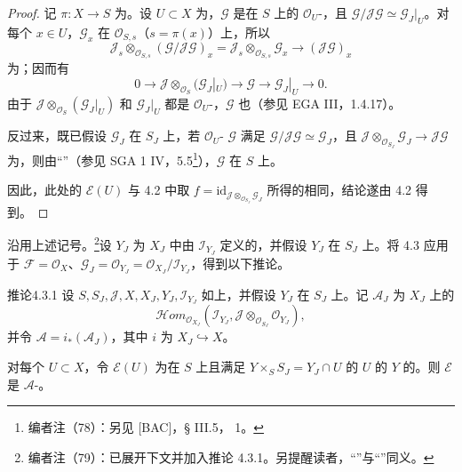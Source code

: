 \begin{proof}
记 $\pi:X\to S$ 为。设 $U\subset X$ 为，$\mathscr G$ 是在 $S$ 上的 $\mathscr O_U$-，且 $\mathscr G/\mathscr J\mathscr G\simeq\mathscr G_J|_U$。对每个 $x\in U$，$\mathscr G_x$ 在 $\mathscr O_{S,s}$（$s=\pi(x)$）上，所以
\[\mathscr J_s\otimes_{\mathscr O_{S,s}}(\mathscr G/\mathscr J\mathscr G)_x=\mathscr J_s\otimes_{\mathscr O_{S,s}}\mathscr G_x\longrightarrow(\mathscr J\mathscr G)_x\]
为；因而有
\[0\longrightarrow\mathscr J\otimes_{\mathscr O_S}(\mathscr G_J|_U)\longrightarrow\mathscr G\longrightarrow\mathscr G_J|_U\longrightarrow0.\]
由于 $\mathscr J\otimes_{\mathscr O_S}(\mathscr G_J|_U)$ 和 $\mathscr G_J|_U$ 都是 $\mathscr O_U$-，$\mathscr G$ 也（参见 EGA III，1.4.17）。

反过来，既已假设 $\mathscr G_J$ 在 $S_J$ 上，若 $\mathscr O_U$- $\mathscr G$ 满足 $\mathscr G/\mathscr J\mathscr G\simeq\mathscr G_J$，且 $\mathscr J\otimes_{\mathscr O_{S_J}}\mathscr G_J\to\mathscr J\mathscr G$ 为，则由“”（参见 SGA 1 IV，5.5\footnote{编者注（78）：另见 [BAC]，§ III.5， 1。}），$\mathscr G$ 在 $S$ 上。

因此，此处的 $\mathscr E(U)$ 与 4.2 中取 $f=\mathrm{id}_{\mathscr J\otimes_{\mathscr O_{S_J}}\mathscr G_J}$ 所得的相同，结论遂由 4.2 得到。
\end{proof}
沿用上述记号。\footnote{编者注（79）：已展开下文并加入推论 4.3.1。另提醒读者，“”与“”同义。}设 $Y_J$ 为 $X_J$ 中由 $\mathscr I_{Y_J}$ 定义的，并假设 $Y_J$ 在 $S_J$ 上。将 4.3 应用于 $\mathscr F=\mathscr O_X$、$\mathscr G_J=\mathscr O_{Y_J}=\mathscr O_{X_J}/\mathscr I_{Y_J}$，得到以下推论。
\begin{SGAresult}{推论}{4.3.1}
设 $S,S_J,\mathscr J,X,X_J,Y_J,\mathscr I_{Y_J}$ 如上，并假设 $Y_J$ 在 $S_J$ 上。记 $\mathscr A_J$ 为 $X_J$ 上的
\[\mathscr Hom_{\mathscr O_{X_J}}(\mathscr I_{Y_J},\mathscr J\otimes_{\mathscr O_{S_J}}\mathscr O_{Y_J}),\]
并令 $\mathscr A=i_*(\mathscr A_J)$，其中 $i$ 为 $X_J\hookrightarrow X$。

对每个 $U\subset X$，令 $\mathscr E(U)$ 为在 $S$ 上且满足 $Y\times_S S_J=Y_J\cap U$ 的 $U$ 的 $Y$ 的。则 $\mathscr E$ 是 $\mathscr A$-。
\end{SGAresult}
